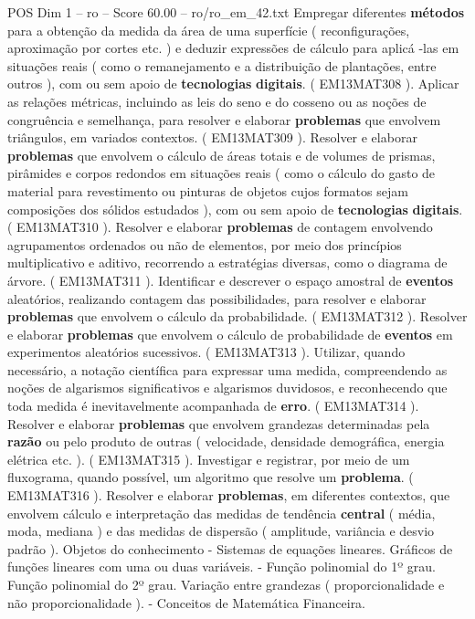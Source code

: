 \begin{textsample}{POS Dim 1 – ro – Score 60.00 – ro/ro\_em\_42.txt}
Empregar diferentes \textbf{métodos} para a obtenção da medida da área de uma superfície ( reconfigurações, aproximação por cortes etc. ) e deduzir expressões de cálculo para aplicá -las em situações reais ( como o remanejamento e a distribuição de plantações, entre outros ), com ou sem apoio de \textbf{tecnologias} \textbf{digitais}. ( EM13MAT308 ).
Aplicar as relações métricas, incluindo as leis do seno e do cosseno ou as noções de congruência e semelhança, para resolver e elaborar \textbf{problemas} que envolvem triângulos, em variados contextos. ( EM13MAT309 ).
Resolver e elaborar \textbf{problemas} que envolvem o cálculo de áreas totais e de volumes de prismas, pirâmides e corpos redondos em situações reais ( como o cálculo do gasto de material para revestimento ou pinturas de objetos cujos formatos sejam composições dos sólidos estudados ), com ou sem apoio de \textbf{tecnologias} \textbf{digitais}. ( EM13MAT310 ).
Resolver e elaborar \textbf{problemas} de contagem envolvendo agrupamentos ordenados ou não de elementos, por meio dos princípios multiplicativo e aditivo, recorrendo a estratégias diversas, como o diagrama de árvore. ( EM13MAT311 ).
Identificar e descrever o espaço amostral de \textbf{eventos} aleatórios, realizando contagem das possibilidades, para resolver e elaborar \textbf{problemas} que envolvem o cálculo da probabilidade. ( EM13MAT312 ).
Resolver e elaborar \textbf{problemas} que envolvem o cálculo de probabilidade de \textbf{eventos} em experimentos aleatórios sucessivos. ( EM13MAT313 ).
Utilizar, quando necessário, a notação científica para expressar uma medida, compreendendo as noções de algarismos significativos e algarismos duvidosos, e reconhecendo que toda medida é inevitavelmente acompanhada de \textbf{erro}. ( EM13MAT314 ).
Resolver e elaborar \textbf{problemas} que envolvem grandezas determinadas pela \textbf{razão} ou pelo produto de outras ( velocidade, densidade demográfica, energia elétrica etc. ). ( EM13MAT315 ).
Investigar e registrar, por meio de um fluxograma, quando possível, um algoritmo que resolve um \textbf{problema}. ( EM13MAT316 ).
Resolver e elaborar \textbf{problemas}, em diferentes contextos, que envolvem cálculo e interpretação das medidas de tendência \textbf{central} ( média, moda, mediana ) e das medidas de dispersão ( amplitude, variância e desvio padrão ).
Objetos do conhecimento - Sistemas de equações lineares.
Gráficos de funções lineares com uma ou duas variáveis. - Função polinomial do 1º grau.
Função polinomial do 2º grau.
Variação entre grandezas ( proporcionalidade e não proporcionalidade ). - Conceitos de Matemática Financeira.

\end{textsample}

